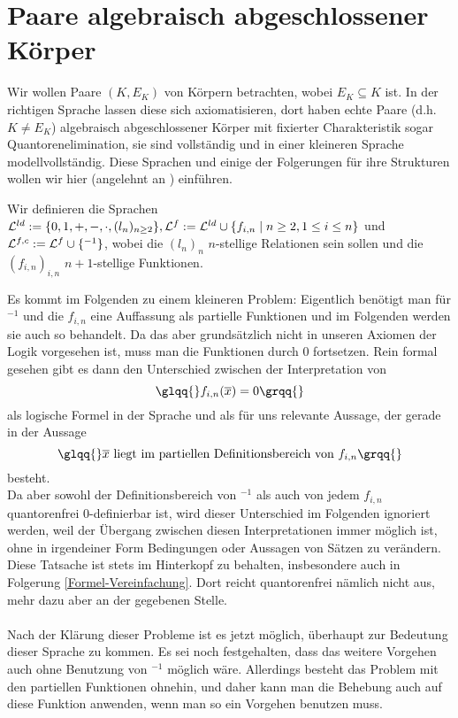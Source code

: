     \newpage
    \section{Paare algebraisch abgeschlossener Körper}
    Wir wollen Paare $(K,E_K)$ von Körpern betrachten, wobei $E_K\subseteq K$ ist. In der richtigen Sprache lassen diese sich axiomatisieren, dort haben echte Paare (d.h. $K\neq E_K$) algebraisch abgeschlossener Körper mit fixierter Charakteristik sogar Quantoren\-elimination, sie sind vollständig und in einer kleineren Sprache modellvollständig. Diese Sprachen und einige der Folgerungen für ihre Strukturen wollen wir hier (angelehnt an \cite{Delon}) einführen.
    
    \begin{definition}
    	Wir definieren die Sprachen $\mathcal{L}^{ld}:=\{0,1,+,-,\cdot,(l_n)_{n\geq2}\},\mathcal{L}^f:=\mathcal{L}^{ld}\cup\{f_{i,n}\mid n\geq2,1\leq i\leq n\}$ und $\mathcal{L}^{f,c}:=\mathcal{L}^f\cup\{^{-1}\}$, wobei die $(l_n)_n$ $n$-stellige Relationen sein sollen und die $(f_{i,n})_{i,n}$ $n+1$-stellige Funktionen.
    \end{definition}
    
    Es kommt im Folgenden zu einem kleineren Problem: Eigentlich benötigt man für $^{-1}$ und die $f_{i,n}$ eine Auffassung als partielle Funktionen und im Folgenden werden sie auch so behandelt. Da das aber grundsätzlich nicht in unseren Axiomen der Logik vorgesehen ist, muss man die Funktionen durch $0$ fortsetzen. Rein formal gesehen gibt es dann den Unterschied zwischen der Interpretation von $$\glqq{}f_{i,n}(\overline{x})=0\grqq{}$$ als logische Formel in der Sprache und als für uns relevante Aussage, der gerade in der Aussage $$\glqq{}\overline{x}\text{ liegt im partiellen Definitionsbereich von }f_{i,n}\grqq{}$$ besteht.\\
    Da aber sowohl der Definitionsbereich von $^{-1}$ als auch von jedem $f_{i,n}$ quantorenfrei 0-definierbar ist, wird dieser Unterschied im Folgenden ignoriert werden, weil der Übergang zwischen diesen Interpretationen immer möglich ist, ohne in irgendeiner Form Bedingungen oder Aussagen von Sätzen zu verändern. Diese Tatsache ist stets im Hinterkopf zu behalten, insbesondere auch in Folgerung \ref{Formel-Vereinfachung}. Dort reicht quantorenfrei nämlich nicht aus, mehr dazu aber an der gegebenen Stelle.\\\\
    Nach der Klärung dieser Probleme ist es jetzt möglich, überhaupt zur Bedeutung dieser Sprache zu kommen. Es sei noch festgehalten, dass das weitere Vorgehen auch ohne Benutzung von \glqq{}$^{-1}$\grqq{} möglich wäre. Allerdings besteht das Problem mit den partiellen Funktionen ohnehin, und daher kann man die Behebung auch auf diese Funktion anwenden, wenn man so ein Vorgehen benutzen muss.
    
